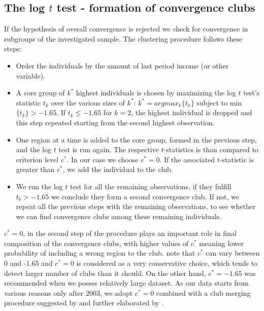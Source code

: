 \documentclass[11pt]{article}
\begin{document}
\subsection{The log $t$ test - formation of convergence clubs }
If the hypothesis of overall convergence is rejected we check for convergence in subgroups of the investigated sample. The clustering procedure follows these steps:
\begin{itemize}
    \item Order the individuals by the amount of last period income (or other variable).
    \item  A core group of $k^{*}$ highest individuals is chosen by maximizing the log $t$ test's statistic $t_{k}$ over the various sizes of $k^{*}$:
    \(k^{*} = arg max_{k}\{t_{k}\}\) subject to min \( \{t_{k}\}> -1.65\). If \(t_{k} \leq -1.65 \) for \(k=2\), the highest individual is dropped and this step repeated starting from the second highest observation. 
    \item One region at a time is added to the core group, formed in the previous step, and the log $t$ test is run again. The respective  $t$-statistics is than compared to criterion level $c^{*}$. In our case we choose $c^{*}=0$. If the associated $t$-statistic is greater than  $c^{*}$, we add the individual to the club.
    \item We run the log $t$ test for all the remaining observations, if they fulfill \(t_b > -1.65\) we conclude they form a second convergence club. If not, we repeat all the previous steps with the remaining observations, to see whether we can find convergence clubs among these remaining individuals.
\end{itemize}    

 \(c^{*} = 0\), in the second step of the procedure plays an important role in final composition of the convergence clubs, with higher values of $c^*$ meaning lower probability of including a wrong region to the club. \citet{phillips2009economic} note that $c^{*}$ can vary between 0 and -1.65 and $c^{*}=0$ is considered as a very conservative choice, which tends to detect larger number of clubs than it should. On the other hand, $c^{*}=-1.65$ was recommended when we posses relatively large dataset. As our data starts from various reasons only after 2003, we adopt $c^*= 0$ combined with a club merging procedure suggested by \citet{phillips2009economic} and further elaborated by \citet{bartkowska2012regional}. 
\end{document}

